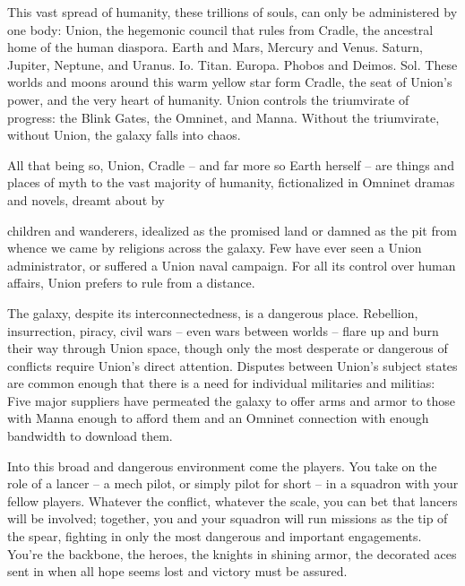 This vast spread of humanity, these trillions of souls, can only be administered by one body:  
Union, the hegemonic council that rules from Cradle, the ancestral home of the human diaspora.  
Earth and Mars, Mercury and Venus. Saturn, Jupiter, Neptune, and Uranus. Io. Titan. Europa.  
Phobos and Deimos. Sol. These worlds and moons around this warm yellow star form Cradle,  
the seat of Union’s power, and the very heart of humanity. Union controls the triumvirate of  
progress: the Blink Gates, the Omninet, and Manna. Without the triumvirate, without Union, the  
galaxy falls into chaos. 
 

All that being so, Union, Cradle -- and far more so Earth herself -- are things and places of myth  
to the vast majority of humanity, fictionalized in Omninet dramas and novels, dreamt about by  

                                                                                                                    


children and wanderers, idealized as the promised land or damned as the pit from whence we  
came by religions across the galaxy. Few have ever seen a Union administrator, or suffered a  
Union naval campaign. For all its control over human affairs, Union prefers to rule from a  
distance. 
 

The galaxy, despite its interconnectedness, is a dangerous place. Rebellion, insurrection, piracy,  
civil wars -- even wars between worlds -- flare up and burn their way through Union space,  
though only the most desperate or dangerous of conflicts require Union’s direct attention.  
Disputes between Union’s subject states are common enough that there is a need for individual  
militaries and militias: Five major suppliers have permeated the galaxy to offer arms and armor to  
those with Manna enough to afford them and an Omninet connection with enough bandwidth to  
download them. 
 

Into this broad and dangerous environment come the players. You take on the role of a lancer --  
a mech pilot, or simply pilot for short -- in a squadron with your fellow players. Whatever the  
conflict, whatever the scale, you can bet that lancers will be involved; together, you and your  
squadron will run missions as the tip of the spear, fighting in only the most dangerous and  
important engagements. You’re the backbone, the heroes, the knights in shining armor, the  
decorated aces sent in when all hope seems lost and victory must be assured. 
 
